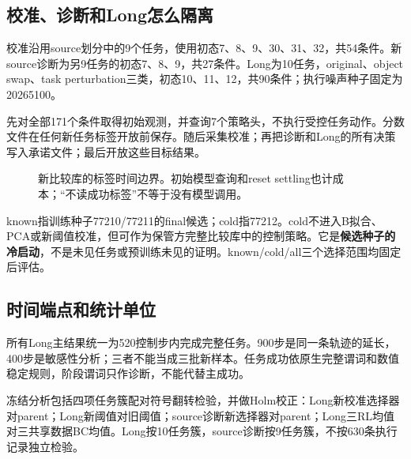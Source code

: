 \documentclass[UTF8,a4paper,fontset=none,zihao=-4]{ctexart}
\begin{document}
\subsection{校准、诊断和Long怎么隔离}
校准沿用source划分中的9个任务，使用初态7、8、9、30、31、32，共54条件。新source诊断为另9任务的初态7、8、9，共27条件。Long为10任务，original、object swap、task perturbation三类，初态10、11、12，共90条件；执行噪声种子固定为20265100。

先对全部171个条件取得初始观测，并查询7个策略头，不执行受控任务动作。分数文件在任何新任务标签开放前保存。随后采集校准；再把诊断和Long的所有决策写入承诺文件；最后开放这些目标结果。
\par
\begin{figure}[htbp]\centering
{}
\caption{新比较库的标签时间边界。初始模型查询和reset settling也计成本；“不读成功标签”不等于没有模型调用。}
\end{figure}
\par
known指训练种子77210/77211的final候选；cold指77212。cold不进入B拟合、PCA或新阈值校准，但可作为保管方完整比较库中的控制策略。它是\textbf{候选种子的冷启动}，不是未见任务或预训练未见的证明。known/cold/all三个选择范围均固定后评估。
\subsection{时间端点和统计单位}
所有Long主结果统一为520控制步内完成完整任务。900步是同一条轨迹的延长，400步是敏感性分析；三者不能当成三批新样本。任务成功依原生完整谓词和数值稳定规则，阶段谓词只作诊断，不能代替主成功。

冻结分析包括四项任务簇配对符号翻转检验，并做Holm校正：Long新校准选择器对parent；Long新阈值对旧阈值；source诊断新选择器对parent；Long三RL均值对三共享数据BC均值。Long按10任务簇，source诊断按9任务簇，不按630条执行记录独立检验。
\end{document}
